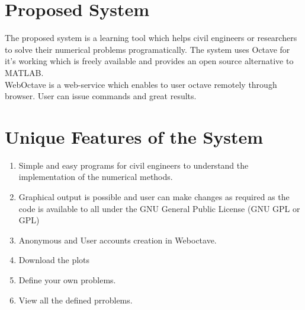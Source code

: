 \section{Proposed System}
The proposed system is a learning tool which helps civil engineers or researchers to solve their numerical problems programatically. The system uses Octave for it's working which is freely available and provides an open source alternative to MATLAB.\\
WebOctave is a web-service which enables to user octave remotely through browser.
User can issue commands and great results.

\section{Unique Features of the System}
\begin{enumerate}
\item Simple and easy programs for civil engineers to understand the implementation of the numerical methods.
\item Graphical output is possible and user can make changes as required as the code is available to all under the GNU General Public License (GNU GPL or GPL)
\item Anonymous and User accounts creation in Weboctave.
\item Download the plots
\item Define your own problems.
\item View all the defined prroblems.
\end{enumerate}

